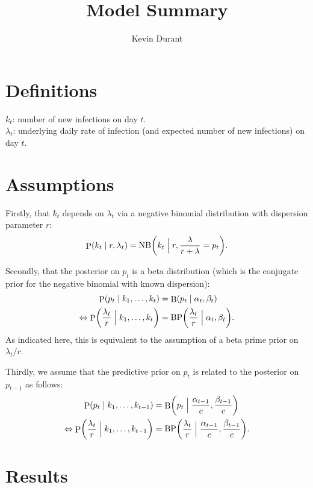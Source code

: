 \documentclass[12pt,a4paper]{article}
\title{Model Summary}
\author{Kevin Durant}
\date{}
\DeclarePairedDelimiter\lr{\lparen}{\rparen}  %
\DeclareMathOperator\Pb{P}                    %
\DeclareMathOperator\B{B}                     %
\DeclareMathOperator\BP{BP}                   %
\DeclareMathOperator\NB{NB}                   %
\begin{document}
\maketitle

\section{Definitions} %

$k_t$: number of new infections on day $t$. \\
$\lambda_t$: underlying daily rate of infection (and expected number of new
infections) on day $t$.

\section{Assumptions} %

Firstly, that $k_t$ depends on $\lambda_t$ via a negative binomial distribution
with dispersion parameter $r$:
\begin{equation*}
  \Pb(k_t \mid r, \lambda_t)
  = \NB\lr*{k_t \Bigm\vert r, \frac{\lambda}{r + \lambda} = p_t}.
\end{equation*}

Secondly, that the posterior on $p_t$ is a beta distribution (which is the
conjugate prior for the negative binomial with known dispersion):
\begin{align*}
  \Pb(p_t \mid k_1, \dots, k_t) &= \B(p_t \mid \alpha_t, \beta_t) \\
  \Leftrightarrow \Pb\lr*{\frac{\lambda_t}{r} \Bigm\vert k_1, \dots, k_t}
    &= \BP\lr*{\frac{\lambda_t}{r} \Bigm\vert \alpha_t, \beta_t}.
\end{align*}
As indicated here, this is equivalent to the assumption of a beta prime prior
on $\lambda_t/r$.

Thirdly, we assume that the predictive prior on $p_t$ is related to the
posterior on $p_{t-1}$ as follows:
\begin{align*}
  \Pb(p_t \mid k_1, \dots, k_{t-1})
    &= \B\lr*{p_t \Bigm\vert \frac{\alpha_{t-1}}{c}, \frac{\beta_{t-1}}{c}} \\
  \Leftrightarrow \Pb\lr*{\frac{\lambda_t}{r} \Bigm\vert k_1, \dots, k_{t-1}}
    &= \BP\lr*{\frac{\lambda_t}{r} \Bigm\vert
    \frac{\alpha_{t-1}}{c}, \frac{\beta_{t-1}}{c}}.
\end{align*}

\section{Results} %
\end{document}
